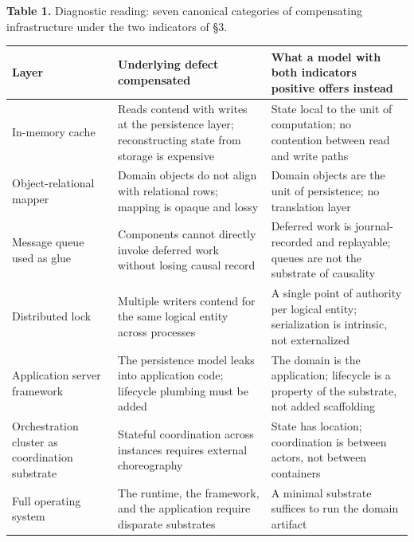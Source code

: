 \documentclass[
]{article}
\newcounter{none} %
\begin{document}
\textbf{Table 1.} Diagnostic reading: seven canonical categories of
compensating infrastructure under the two indicators of §3.

{\def\LTcaptype{none} %
\begin{longtable}[]{@{}
  >{\raggedright\arraybackslash}p{}
  >{\raggedright\arraybackslash}p{}
  >{\raggedright\arraybackslash}p{}@{}}
\toprule\noalign{}
\begin{minipage}[b]{\linewidth}\raggedright
Layer
\end{minipage} & \begin{minipage}[b]{\linewidth}\raggedright
Underlying defect compensated
\end{minipage} & \begin{minipage}[b]{\linewidth}\raggedright
What a model with both indicators positive offers instead
\end{minipage} \\
\midrule\noalign{}
\endhead
\bottomrule\noalign{}
\endlastfoot
In-memory cache & Reads contend with writes at the persistence layer;
reconstructing state from storage is expensive & State local to the unit
of computation; no contention between read and write paths \\
Object-relational mapper & Domain objects do not align with relational
rows; mapping is opaque and lossy & Domain objects are the unit of
persistence; no translation layer \\
Message queue used as glue & Components cannot directly invoke deferred
work without losing causal record & Deferred work is journal-recorded
and replayable; queues are not the substrate of causality \\
Distributed lock & Multiple writers contend for the same logical entity
across processes & A single point of authority per logical entity;
serialization is intrinsic, not externalized \\
Application server framework & The persistence model leaks into
application code; lifecycle plumbing must be added & The domain is the
application; lifecycle is a property of the substrate, not added
scaffolding \\
Orchestration cluster as coordination substrate & Stateful coordination
across instances requires external choreography & State has location;
coordination is between actors, not between containers \\
Full operating system & The runtime, the framework, and the application
require disparate substrates & A minimal substrate suffices to run the
domain artifact \\
\end{longtable}
}
\end{document}
